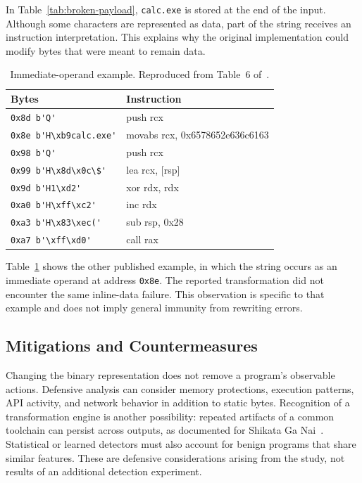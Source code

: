 \documentclass[runningheads]{llncs}
\begin{document}
In Table~\ref{tab:broken-payload}, \texttt{calc.exe} is stored at the end of the input. Although some characters are represented as data, part of the string receives an instruction interpretation. This explains why the original implementation could modify bytes that were meant to remain data.

\begin{table}[t]
    \caption{Immediate-operand example. Reproduced from Table~6 of~\cite{zone_secrypt_2026}.}
    \label{tab:functional-payload}
    \small
    \centering
    \setlength{\tabcolsep}{3pt}
    \begin{tabular}{ll}
        \hline
        \textbf{Bytes}                  & \textbf{Instruction} \\ \hline
        \verb|0x8d b'Q'|              &  push     rcx \\ \hline
        \verb|0x8e b'H\xb9calc.exe'|  &  movabs   rcx, 0x6578652e636c6163 \\ \hline
        \verb|0x98 b'Q'|              &  push     rcx \\ \hline
        \verb|0x99 b'H\x8d\x0c\$'|     & lea      rcx, [rsp] \\ \hline
        \verb|0x9d b'H1\xd2'|          & xor      rdx, rdx \\ \hline
        \verb|0xa0 b'H\xff\xc2'|       & inc      rdx \\ \hline
        \verb|0xa3 b'H\x83\xec('|      & sub      rsp, 0x28 \\ \hline
        \verb|0xa7 b'\xff\xd0'|        & call     rax \\ \hline
    \end{tabular}
\end{table}

Table~\ref{tab:functional-payload} shows the other published example, in which the string occurs as an immediate operand at address \texttt{0x8e}. The reported transformation did not encounter the same inline-data failure. This observation is specific to that example and does not imply general immunity from rewriting errors.

\subsection{Mitigations and Countermeasures}
Changing the binary representation does not remove a program's observable actions. Defensive analysis can consider memory protections, execution patterns, API activity, and network behavior in addition to static bytes. Recognition of a transformation engine is another possibility: repeated artifacts of a common toolchain can persist across outputs, as documented for Shikata Ga Nai~\cite{sgnstrong}. Statistical or learned detectors must also account for benign programs that share similar features. These are defensive considerations arising from the study, not results of an additional detection experiment.
\end{document}
